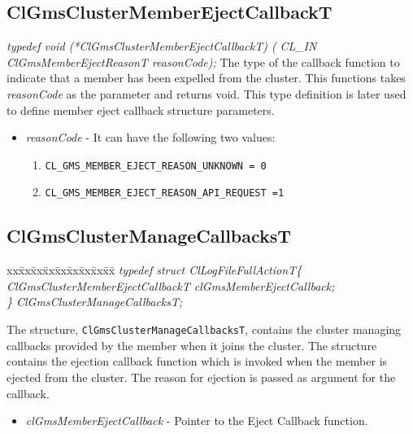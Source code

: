 \begin{flushleft}
\subsection{ClGmsClusterMemberEjectCallbackT}
\textit{typedef void (*ClGmsClusterMemberEjectCallbackT) (}
\newline \textit{CL\_\-IN ClGmsMemberEjectReasonT   reasonCode);}
\newline
\newline
The type of the callback function to indicate that a member has been expelled from the cluster. This functions takes
\textit{reasonCode} as the parameter and returns void. This type definition is later used to define member eject callback
  structure parameters.
\begin{itemize}
\item
\textit{reasonCode} -  It can have the following two values:
 \begin{enumerate}
 \item
 {\tt{CL\_\-GMS\_\-MEMBER\_\-EJECT\_\-REASON\_\-UNKNOWN = 0}}
 \item
 {\tt{CL\_\-GMS\_\-MEMBER\_\-EJECT\_\-REASON\_\-API\_\-REQUEST =1}}
 \end{enumerate}
\end{itemize}



\subsection{ClGmsClusterManageCallbacksT}
\begin{tabbing}
xx\=xx\=xx\=xx\=xx\=xx\=xx\=xx\=xx\=\kill
\textit{typedef struct ClLogFileFullActionT\{}\\
\>\>\>\>\textit{ClGmsClusterMemberEjectCallbackT clGmsMemberEjectCallback;}\\
\textit{\} ClGmsClusterManageCallbacksT;}\end{tabbing}

 The structure, {\tt{ClGmsClusterManageCallbacksT}}, contains the cluster managing callbacks provided by the member when it joins the cluster.
 The structure contains the ejection callback function
 which is invoked when the member is ejected from the cluster. The reason for ejection is
 passed as argument for the callback.
\begin{itemize}
\item
\textit{clGmsMemberEjectCallback} - Pointer to the Eject Callback function.
\end{itemize}




\end{flushleft}
